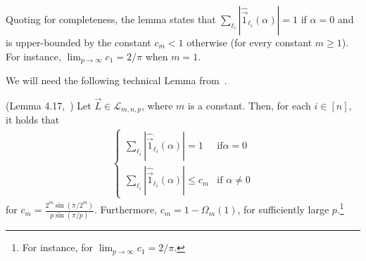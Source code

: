
Quoting for completeness, the lemma states
that $\sum_{\ell_i}|\widehat{\vec{1}}_{\ell_i}(\alpha)|= 1$ if $\alpha=0$ and is upper-bounded by the constant $c_m<1$ otherwise (for every constant $m\geq 1$). For instance, $\lim_{p\rightarrow \infty} c_1= 2/\pi$ when $m=1$.

We will need the following technical Lemma from~\cite{EPRINT:BDIR19}.
\begin{lemma}(Lemma 4.17,~\cite{EPRINT:BDIR19}) \label{lem:sumlibound}
Let $\vec{L}\in\mathcal{L}_{m,n,p}$, where $m$ is a constant. Then, for each $i \in [n]$, it holds that 
\begin{align}
\nonumber
\begin{cases}
\sum_{\ell_i}|\widehat{\vec{1}}_{\ell_i}(\alpha)|=1 &\text{if}\alpha=0 \\
\sum_{\ell_i}|\widehat{\vec{1}}_{\ell_i}(\alpha)|\leq c_m &\text{if }\alpha\neq 0\end{cases}
\end{align}
for $c_m=\frac{2^m \sin{(\pi / 2^m)}}{p \sin{(\pi / p)}}$. Furthermore, $c_m=1-\Omega_m(1)$, for sufficiently large $p$.\footnote{For instance, for $\lim_{p\rightarrow \infty} c_1= 2/\pi$.}
\end{lemma}
    




